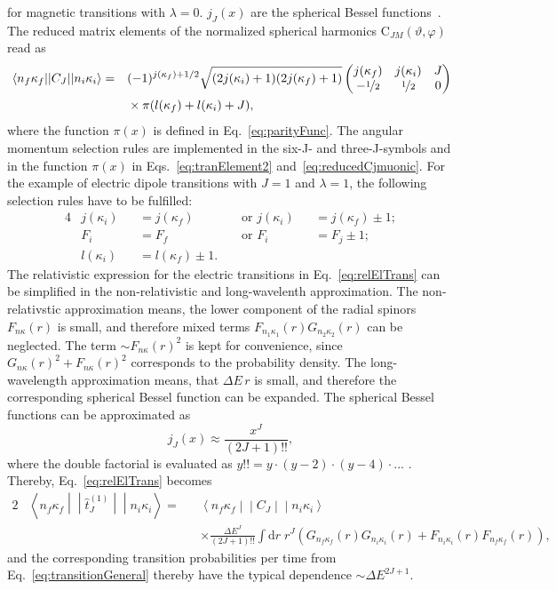 for magnetic transitions with $\lambda = 0$. $j_J(x)$ are the spherical Bessel functions~\cite[Eq. 10.47.3]{NIST:DLMF}.
The reduced matrix elements of the normalized spherical harmonics $\text{C}_{JM}(\vartheta,\varphi)$ read as~\cite{johnson2007}
\begin{alignat}{2}
&\left<n_f\kappa_f\middle|\middle|C_J\middle|\middle|n_i\kappa_i\right>=&&(-1)^{j(\kappa_f)+1/2}\sqrt{(2j(\kappa_i)+1)(2j(\kappa_f)+1)}
\begin{pmatrix}
j(\kappa_f)&j(\kappa_i)&J\\
-\nicefrac{1}{2}&\nicefrac{1}{2}&0
\end{pmatrix}
\notag\\
&&&\times\pi(l(\kappa_f)+l(\kappa_i)+J),
\label{eq:reducedCjmuonic}
\end{alignat}
where the function $\pi(x)$ is defined in Eq.~\eqref{eq:parityFunc}. The angular momentum selection rules are implemented in the six-J- and three-J-symbols and in the function $\pi(x)$ in Eqs.~\eqref{eq:tranElement2} and~\eqref{eq:reducedCjmuonic}. For the example of electric dipole transitions with $J=1$ and $\lambda=1$, the following selection rules have to be fulfilled:
\begin{alignat}{4}
&j(\kappa_i)&&=j(\kappa_f) &&\text{ or } j(\kappa_i)&&=j(\kappa_f)\pm 1;\\
&F_i &&= F_f &&\text{ or } F_i&&=F_j\pm 1;\\
&l(\kappa_i)&&=l(\kappa_f)\pm 1.
\label{eq:dipoleSelectionRules}
\end{alignat}
The relativistic expression for the electric transitions in Eq.~\eqref{eq:relElTrans} can be simplified in the non-relativistic and long-wavelenth approximation. The non-relativstic approximation means, the lower component of the radial spinors $F_{n\kappa}(r)$ is small, and therefore mixed terms $F_{n_1\kappa_1}(r)G_{n_2\kappa_2}(r)$ can be neglected. The term $\sim F_{n\kappa}(r)^2$ is kept for convenience, since $G_{n\kappa}(r)^2+F_{n\kappa}(r)^2$ corresponds to the probability density. The long-wavelength approximation means, that $\Delta E \, r$ is small, and therefore the corresponding spherical Bessel function can be expanded. The spherical Bessel functions can be approximated as
\begin{equation}
j_J(x)\approx \frac{x^J}{(2J+1)!!},
\end{equation}
where the double factorial is evaluated as $y!! = y \cdot (y-2) \cdot (y-4) \cdot ...\,\,$. Thereby, Eq.~\eqref{eq:relElTrans} becomes
\begin{alignat}{2}
\label{eq:relElTransNR}
&\left< n_{f}\kappa_{f}\middle|\middle|\hat{t}^{(1)}_{J}\middle|\middle|n_{i}\kappa_{i}\right>=&&
\left<n_f\kappa_f\middle|\middle|C_J\middle|\middle|n_i\kappa_i\right>\\
&&&\times\frac{\Delta E^J}{(2J+1)!!}\int\text{d}r \;r^J\left(G_{n_f\kappa_f}(r)G_{n_i\kappa_i}(r)+F_{n_i\kappa_i}(r)F_{n_f\kappa_f}(r)\right),
\end{alignat}
and the corresponding transition probabilities per time from Eq.~\eqref{eq:transitionGeneral} thereby have the typical dependence $\sim \Delta E ^{2J+1}$.\\

